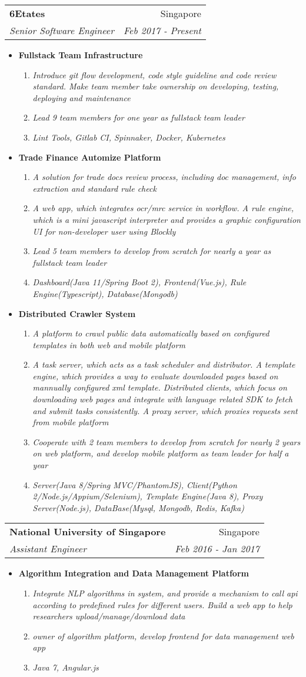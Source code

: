 \documentclass[letterpaper,11pt]{article}
\makeatletter
\newcommand{\resumeItem}[1]{
  \item\small{
    \textbf{#1 \vspace{-2pt}}
  }
}
\newcommand{\resumeSubItem}[1]{
  \item[-]\small{
    \textsl{#1\vspace{-1pt}}
  }
}
\newcommand{\resumeSubheading}[4]{
  \vspace{-1pt}\item
    \begin{tabular*}{0.97\textwidth}[t]{l@{\extracolsep{\fill}}r}
      \textbf{#1} & #2 \\
      \textit{\small#3} & \textit{\small #4} \\
    \end{tabular*}\vspace{-5pt}
}
\newcommand{\resumeItemListStart}{\begin{itemize}}
\newcommand{\resumeItemListEnd}{\end{itemize}\vspace{-5pt}}
\newcommand{\resumeSubItemListStart}{\begin{enumerate}}
\newcommand{\resumeSubItemListEnd}{\end{enumerate}\vspace{6pt}}
\makeatother
\begin{document}
    \resumeSubheading
      {6Etates}{Singapore}
      {Senior Software Engineer}{Feb 2017 - Present}
      \resumeItemListStart
        \resumeItem{Fullstack Team Infrastructure}
        \resumeSubItemListStart
          \resumeSubItem{Introduce git flow development, code style guideline and code review standard. Make team member take ownership on developing, testing, deploying and maintenance}
          \resumeSubItem{Lead 9 team members for one year as fullstack team leader}
          \resumeSubItem{Lint Tools, Gitlab CI, Spinnaker, Docker, Kubernetes}
        \resumeSubItemListEnd
        \resumeItem{Trade Finance Automize Platform}
        \resumeSubItemListStart
          \resumeSubItem{A solution for trade docs review process, including doc management, info extraction and standard rule check}
          \resumeSubItem{A web app, which integrates ocr/mrc service in workflow. A rule engine, which is a mini javascript interpreter and provides a graphic configuration UI for non-developer user using Blockly}
          \resumeSubItem{Lead 5 team members to develop from scratch for nearly a year as fullstack team leader}
          \resumeSubItem{Dashboard(Java 11/Spring Boot 2), Frontend(Vue.js), Rule Engine(Typescript), Database(Mongodb)}
        \resumeSubItemListEnd
        \resumeItem{Distributed Crawler System}
        \resumeSubItemListStart
          \resumeSubItem{A platform to crawl public data automatically based on configured templates in both web and mobile platform}
          \resumeSubItem{A task server, which acts as a task scheduler and distributor. A template engine, which provides a way to evaluate downloaded pages based on mannually configured xml template. Distributed clients, which focus on downloading web pages and integrate with language related SDK to fetch and submit tasks consistently. A proxy server, which proxies requests sent from mobile platform}
          \resumeSubItem{Cooperate with 2 team members to develop from scratch for nearly 2 years on web platform, and develop mobile platform as team leader for half a year}
          \resumeSubItem{Server(Java 8/Spring MVC/PhantomJS), Client(Python 2/Node.js/Appium/Selenium), Template Engine(Java 8), Proxy Server(Node.js), DataBase(Mysql, Mongodb, Redis, Kafka)}
        \resumeSubItemListEnd
      \resumeItemListEnd
      
    \resumeSubheading
      {National University of Singapore}{Singapore}
      {Assistant Engineer}{Feb 2016 - Jan 2017}
      \resumeItemListStart
        \resumeItem{Algorithm Integration and Data Management Platform}
        \resumeSubItemListStart
          \resumeSubItem{Integrate NLP algorithms in system, and provide a mechanism to call api according to predefined rules for different users. Build a web app to help researchers upload/manage/download data}
          \resumeSubItem{owner of algorithm platform, develop frontend for data management web app}
          \resumeSubItem{Java 7, Angular.js}
        \resumeSubItemListEnd
      \resumeItemListEnd
\end{document}
